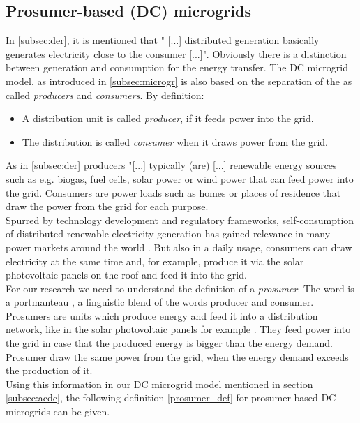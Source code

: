 \subsection{Prosumer-based (DC) microgrids}
\label{subsec:prosumer}
\par In \ref{subsec:der}, it is mentioned that " [...] distributed generation basically generates electricity close to the consumer [...]". Obviously there is a distinction between generation and consumption for the energy transfer. The DC microgrid model, as introduced in \ref{subsec:microgr} is also based on the separation of the as called \textit{producers} and \textit{consumers}. By definition:
\begin{itemize}
    \item A distribution unit is called \textit{producer}, if it feeds power into the grid. 
    \item The distribution is called \textit{consumer} when it draws power from the grid.
\end{itemize}
\par As in \ref{subsec:der} producers "[...] typically (are) [...] renewable energy sources such as e.g. biogas, fuel cells, solar power or wind power that can feed power into the grid. Consumers are power loads such as homes or places of residence that draw the power from the grid for each purpose. 
\\Spurred by technology development and regulatory frameworks, self-consumption of distributed
renewable electricity generation has gained relevance in many power markets around the world \cite{prosumage}. But also in a daily usage, consumers can draw electricity at the same time and, for example, produce it via the solar photovoltaic panels on the roof and feed it into the grid.
\\For our research we need to understand the definition of a \textit{prosumer}. The word is a portmanteau \cite{portm} , a linguistic blend of the words producer and consumer. Prosumers are units which produce energy and feed it into a distribution network, like in the solar photovoltaic panels for example \cite{prosume}. They feed power into the grid in case that the produced energy is bigger than the energy demand. Prosumer draw the same power from the grid, when the energy demand exceeds the production of it. %
\\Using this information in our DC microgrid model mentioned in section \ref{subsec:acdc}, the following definition \ref{prosumer_def} for prosumer-based DC microgrids can be given. \\

